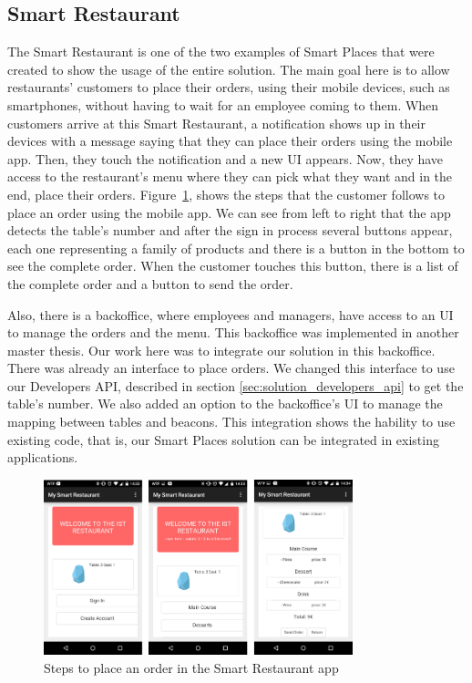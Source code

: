 \subsection{Smart Restaurant}
\label{sub:solution_smart_restaurant}
The Smart Restaurant is one of the two examples of Smart Places that were created to show the usage of the entire solution.
The main goal here is to allow restaurants' customers to place their orders, using their mobile devices, such as smartphones, without having to wait for an employee coming to them.
When customers arrive at this Smart Restaurant, a notification shows up in their devices with a message saying that they can place their orders using the mobile app.
Then, they touch the notification and a new \gls{UI} appears.
Now, they have access to the restaurant's menu where they can pick what they want and in the end, place their orders.
Figure~\ref{fig:smart_restaurant_app}, shows the steps that the customer follows to place an order using the mobile app. We can see from left to right that the app detects the table's number and after the sign in process several buttons appear, each one representing a family of products and there is a button in the bottom to see the complete order.
When the customer touches this button, there is a list of the complete order and a button to send the order.

Also, there is a backoffice, where employees and managers, have access to an \gls{UI} to manage the orders and the menu.
This backoffice was implemented in another master thesis\cite{SLOC}.
Our work here was to integrate our solution in this backoffice.
There was already an interface to place orders.
We changed this interface to use our Developers \gls{API}, described in section \ref{sec:solution_developers_api} to get the table's number.
We also added an option to the backoffice's \gls{UI} to manage the mapping between tables and beacons.
This integration shows the hability to use existing code, that is, our Smart Places solution can be integrated in existing applications.

\begin{figure}[!ht]
  \centering
    \includegraphics[width=0.8\textwidth, keepaspectratio]{images/screenshots/smart_restaurant_app}
    \caption[Smart Restaurant]{Steps to place an order in the Smart Restaurant app}
    \label{fig:smart_restaurant_app}
\end{figure}

